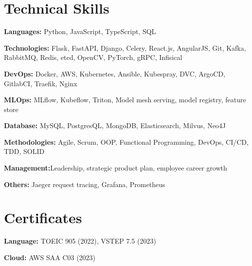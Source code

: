 \documentclass[letterpaper,11pt]{article}
\begin{document}
\section{Technical Skills}
 \begin{itemize}[leftmargin=0.15in, label={}]
    \small{\item{
     \textbf{Languages:}{ Python, JavaScript, TypeScript, SQL} \\ \vspace{3pt}

        \textbf{Technologies:}{ Flask, FastAPI, Django, Celery, React.js, AngularJS, Git, Kafka, RabbitMQ, Redis, etcd, OpenCV, PyTorch, gRPC, Infisical} \\ \vspace{3pt}

        \textbf{DevOps:}{ Docker, AWS, Kubernetes, Ansible, Kubespray, DVC, ArgoCD, GitlabCI, Traefik, Nginx} \\ \vspace{3pt}

        \textbf{MLOps:}{ MLflow, Kubeflow, Triton, Model mesh serving, model registry, feature store} \\  \vspace{3pt}

        \textbf{Database:}{  MySQL, PostgresQL, MongoDB, Elasticsearch, Milvus, Neo4J} \\ \vspace{3pt}

        \textbf{Methodologies:}{ Agile, Scrum, OOP, Functional Programming, DevOps, CI/CD, TDD, SOLID} \\ \vspace{3pt}

        \textbf{Management:}{Leadership, strategic product plan, employee career growth} \\ \vspace{3pt}

	\textbf{Others: }{Jaeger request tracing, Grafana, Prometheus} \\ \vspace{3pt}
    }}
 \end{itemize}

\section{Certificates}
 \begin{itemize}[leftmargin=0.15in, label={}]
    \small{\item{
     \textbf{Language:}{ TOEIC 905 (2022), VSTEP 7.5 (2023)} \\ \vspace{3pt}

        \textbf{Cloud:}{ AWS SAA C03 (2023)} \\ \vspace{3pt}

    }}
 \end{itemize}



\end{document}
